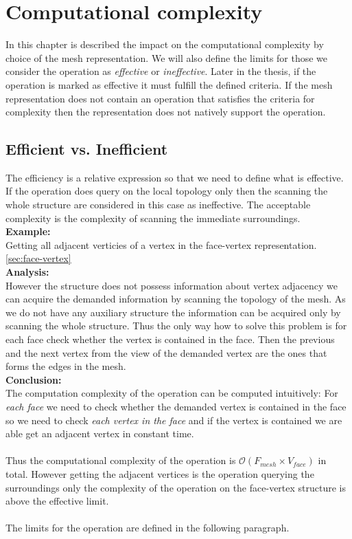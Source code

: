 \chapter{Computational complexity}

In this chapter is described the impact on the computational complexity by choice of the mesh
representation. We will also define the limits for those we consider the operation
as \emph{effective} or \emph{ineffective}. Later in the thesis, if the operation is
marked as effective it must fulfill the defined criteria. If the mesh representation
does not contain an operation that satisfies the criteria for complexity then
the representation does not natively support the operation.

\section{Efficient vs. Inefficient}

The efficiency is a relative expression so that we need to define what is effective.
If the operation does query on the local topology only then the scanning the whole structure
are considered in this case as ineffective. The acceptable complexity is the complexity
of scanning the immediate surroundings.\\

\textbf{Example:}\\
Getting all adjacent verticies of a vertex in the face-vertex representation. \ref{sec:face-vertex}\\

\textbf{Analysis:}\\
However the structure does not possess information about vertex adjacency
we can acquire the demanded information by scanning the topology of the mesh.
As we do not have any auxiliary structure the information can be acquired only by
scanning the whole structure. Thus the only way how to solve this problem
is for each face check whether the vertex is contained in the face. Then the
previous and the next vertex from the view of the demanded vertex are the ones
that forms the edges in the mesh.\\

\textbf{Conclusion:}\\
The computation complexity of the operation can be computed intuitively:
For \emph{each face} we need to check whether the demanded vertex is contained in the
face so we need to check \emph{each vertex in the face} and if the vertex is contained
we are able get an adjacent vertex in constant time.\\
\\
Thus the computational complexity of the operation
is $\mathcal{O}(F_{mesh} \times V_{face})$ in total.
However getting the adjacent vertices is the operation querying the surroundings only
the complexity of the operation on the face-vertex structure is above the effective limit.\\
\\
The limits for the operation are defined in the following paragraph.

